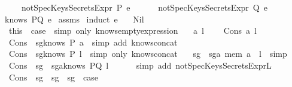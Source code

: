 \begin{isabellebody}
\ \ \ \ \ \ {\isachardoublequoteopen}notSpecKeysSecretsExpr\ P\ e{\isachardoublequoteclose}\isanewline
\ \ \ \ \ \ {\isachardoublequoteopen}notSpecKeysSecretsExpr\ Q\ e{\isachardoublequoteclose}\ \isanewline
\ \ {\isachardoublequoteopen}knows\ PQ\ e{\isachardoublequoteclose}\isanewline
\isadelimproof
\endisadelimproof
\isatagproof
{}\isamarkupfalse \ assms\isanewline
{}\isamarkupfalse \ {\isacharparenleft}induct\ e{\isacharparenright}\isanewline
\ \ \isamarkupfalse \ Nil\ \isanewline
\ \ \isamarkupfalse \ this\ \isamarkupfalse \ {\isacharquery}case\ \isamarkupfalse \ {\isacharparenleft}simp\ only{\isacharcolon}\ knows{\isacharunderscore}emptyexpression{\isacharparenright}\isanewline
{}\isamarkupfalse \isanewline
\ \ \isamarkupfalse \ a\ l\ \isanewline
\ \ \isamarkupfalse \ {\isacharparenleft}Cons\ a\ l{\isacharparenright}\isanewline
\ \ \isamarkupfalse \ Cons\ \isamarkupfalse \ sg{}{\isacharcolon}{\isachardoublequoteopen}knows\ P\ {\isacharbrackleft}a{\isacharbrackright}{\isachardoublequoteclose}\ \isamarkupfalse \ {\isacharparenleft}simp\ add{\isacharcolon}\ knows{\isacharunderscore}concat{\isacharunderscore}{}{\isacharparenright}\isanewline
\ \ \isamarkupfalse \ Cons\ \isamarkupfalse \ sg{}{\isacharcolon}{\isachardoublequoteopen}knows\ P\ l{\isachardoublequoteclose}\ \isamarkupfalse \ {\isacharparenleft}simp\ only{\isacharcolon}\ knows{\isacharunderscore}concat{\isacharunderscore}{}{\isacharparenright}\isanewline
\ \ \isamarkupfalse \ sg{}\ \isamarkupfalse \ sg{}{\isacharcolon}{\isachardoublequoteopen}a\ mem\ {\isacharparenleft}a\ {\isacharhash}\ l{\isacharparenright}{\isachardoublequoteclose}\ \isamarkupfalse \ simp\isanewline
\ \ \isamarkupfalse \ Cons\ \ sg{}\ \isamarkupfalse \ sg{}a{\isacharcolon}{\isachardoublequoteopen}knows\ PQ\ l{\isachardoublequoteclose}\ \isanewline
\ \ \ \ \isamarkupfalse \ {\isacharparenleft}simp\ add{\isacharcolon}\ notSpecKeysSecretsExpr{\isacharunderscore}L{}{\isacharparenright}\isanewline
\ \ \isamarkupfalse \ Cons\ \ sg{}\ \ sg{}\ \ sg{}\ \isamarkupfalse \ {\isacharquery}case\isanewline

\end{isabellebody}
